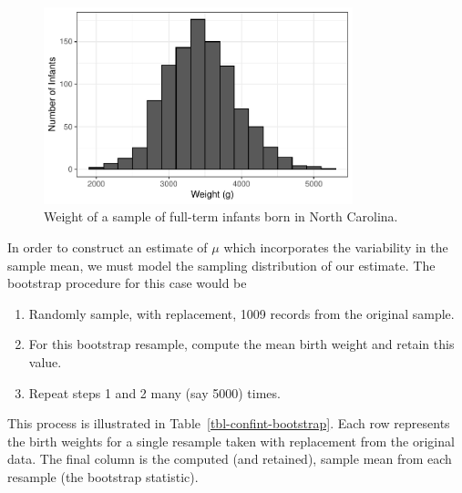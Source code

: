 \documentclass[
  letterpaper,
  DIV=11,
  numbers=noendperiod]{scrreprt}
\providecommand{\tightlist}{%
  \setlength{\itemsep}{0pt}\setlength{\parskip}{0pt}}\usepackage{longtable,booktabs,array}
\theoremstyle{plain}
\theoremstyle{definition}
\theoremstyle{definition}
\theoremstyle{remark}
\begin{document}
\begin{figure}

{\centering \includegraphics[width=0.8\textwidth,height=\textheight]{./images/fig-confint-histogram-1.pdf}

}

\caption{\label{fig-confint-histogram}Weight of a sample of full-term
infants born in North Carolina.}

\end{figure}

In order to construct an estimate of \(\mu\) which incorporates the
variability in the sample mean, we must model the sampling distribution
of our estimate. The bootstrap procedure for this case would be

\begin{enumerate}
\def\labelenumi{\arabic{enumi}.}
\tightlist
\item
  Randomly sample, with replacement, 1009 records from the original
  sample.
\item
  For this bootstrap resample, compute the mean birth weight and retain
  this value.
\item
  Repeat steps 1 and 2 many (say 5000) times.
\end{enumerate}

This process is illustrated in Table~\ref{tbl-confint-bootstrap}. Each
row represents the birth weights for a single resample taken with
replacement from the original data. The final column is the computed
(and retained), sample mean from each resample (the bootstrap
statistic).
\end{document}
